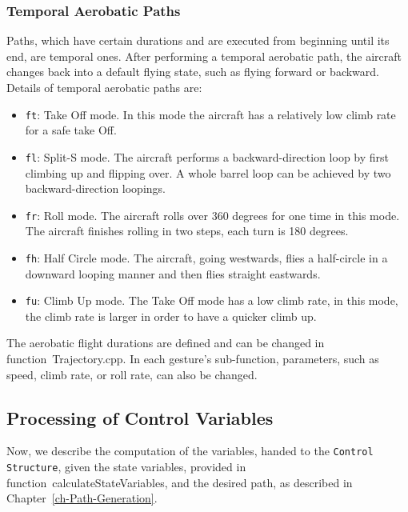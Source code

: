 \documentclass[11pt,a4paper]{scrartcl}		%
\begin{document}
\subsubsection*{Temporal Aerobatic Paths}

Paths, which have certain durations and are executed from beginning until its end, are  temporal ones. After performing a temporal aerobatic path, the aircraft changes back into a default flying state, such as flying forward or backward. 
Details of temporal aerobatic paths are:

\begin{itemize}

\item
\texttt{ft}: Take Off mode. In this mode the aircraft has a relatively low climb rate for a safe take Off.

\item
\texttt{fl}: Split-S mode. The aircraft performs a backward-direction loop by first climbing up and flipping over. A whole barrel loop can be achieved by two backward-direction loopings. 

\item
\texttt{fr}: Roll mode. The aircraft rolls over 360 degrees for one time in this mode. The aircraft finishes rolling in two steps, each turn is 180 degrees.

\item
\texttt{fh}: Half Circle mode. The aircraft, going westwards, flies a half-circle in a downward looping manner and then flies straight eastwards.

\item
\texttt{fu}: Climb Up mode. The Take Off mode has a low climb rate, in this mode, the climb rate is larger in order to have a quicker climb up.

\end{itemize}

The aerobatic flight durations are defined and can be changed in function~\textsf{Trajectory.cpp}. In each gesture's sub-function, parameters, such as speed, climb rate, or roll rate, can also be changed.

\medskip





\subsection{Processing of Control Variables} \label{ch-control-variables}

Now, we describe the computation of the variables, handed to the \texttt{Control Structure}, given the state variables, provided in function~\textsf{calculateStateVariables}, and the desired path, as described in Chapter~\ref{ch-Path-Generation}.
\end{document}

